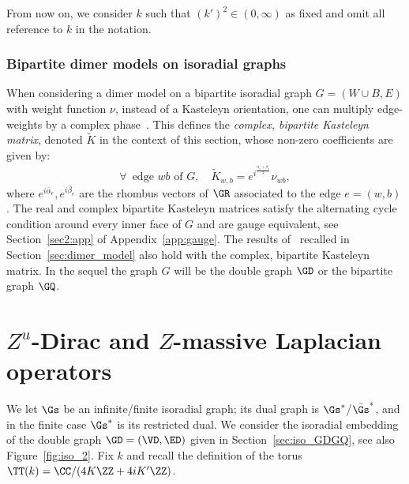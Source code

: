 \documentclass[a4paper,twoside,11pt]{article}
\begin{document}
From now on, we consider $k$ such that $(k')^2\in(0,\infty)$ as fixed and omit all reference to $k$ in the notation.




\subsubsection{Bipartite dimer models on isoradial graphs}\label{sec:Kast_complex}

When considering a dimer model on a bipartite isoradial graph $G=(W\cup B,E)$ with weight function $\nu$, instead of a Kasteleyn orientation, one can multiply edge-weights
by a complex phase~\cite{Kuperberg,Kenyon3}. This defines the \emph{complex, bipartite Kasteleyn matrix}, denoted $\tilde{K}$
in the context of this section, whose non-zero coefficients are given by:
\[
\forall\,\text{ edge $wb$ of $G$},\quad \tilde{K}_{w,b}=e^{i^{\frac{\bar{\alpha}_e+\bar{\beta}_e}{2}}}\nu_{wb},
\]
where $e^{i\bar{\alpha}_e},e^{i\bar{\beta}_e}$ are the rhombus vectors of $\GR$ associated to the edge 
$e=(w,b)$. The real and complex bipartite Kasteleyn matrices satisfy the alternating cycle condition around every inner face of 
$G$ and are gauge equivalent, see Section~\ref{sec2:app} of Appendix~\ref{app:gauge}. The results of~\cite{Kasteleyn1,Kasteleyn2,Kenyon0}
recalled in Section~\ref{sec:dimer_model} also hold with the complex, bipartite Kasteleyn matrix.
In the sequel the graph $G$ will be the double graph $\GD$ or the bipartite graph $\GQ$.




\section{$Z^u$-Dirac and $Z$-massive Laplacian operators}\label{sec:Z_Dirac_Z_Lap}

We let $\Gs$ be an infinite/finite isoradial graph; its dual graph is $\Gs^*$/$\bar{\Gs}^*$, and in the finite case $\Gs^*$ is
its restricted dual. We consider the isoradial embedding of the double graph $\GD=(\VD,\ED)$ given in 
Section~\ref{sec:iso_GDGQ}, see also Figure~\ref{fig:iso_2}.
Fix $k$ and recall the definition of the torus $\TT(k)=\CC/(4K\ZZ+4iK'\ZZ)$. 
\end{document}
